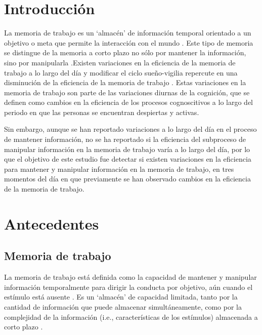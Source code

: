 \documentclass[12pt,letterpaper,final]{article}
\let\cite\cite %
\begin{document}
\section{Introducción}
La memoria de trabajo es un `almacén' de información temporal orientado a un objetivo o meta que permite la interacción con el mundo \cite{Baddeley2001}. Este tipo de memoria se distingue de la memoria a corto plazo no sólo por mantener la información, sino por manipularla \cite{Baddeley2001}.Existen variaciones en la eficiencia de la memoria de trabajo a lo largo del día y modificar el ciclo sueño-vigilia repercute en una disminución de la eficiencia de la memoria de trabajo \cite{Baddeley1970,Folkard1980,Folkard1983,Ramirez2006,Valdez2012,Valdez2014,Schmidt2015}.
Estas variaciones en la memoria de trabajo son parte de las variaciones diurnas de la cognición, que se definen como cambios en la eficiencia de los procesos cognoscitivos  a lo largo del periodo en que las personas se encuentran despiertas y activas.

Sin embargo, aunque se han reportado variaciones a lo largo del día en el proceso de mantener información, no se ha reportado si la eficiencia del subproceso de manipular información en la memoria de trabajo varía a lo largo del día, por lo que el objetivo de este estudio fue detectar si existen variaciones en la eficiencia para mantener y manipular información en la memoria de trabajo, en tres momentos del día en que previamente se han observado cambios en la eficiencia de la memoria de trabajo.
\newpage

\section{Antecedentes}

\subsection{Memoria de trabajo}
La memoria de trabajo está definida como la capacidad de mantener y manipular información temporalmente para dirigir la conducta por objetivo, aún cuando el estímulo está ausente \cite{Eriksson2015,Baddeley1974,Ricker2010}.
Es un `almacén' de capacidad limitada, tanto por la cantidad de información que puede almacenar simultáneamente, como por la complejidad de la información (i.e., características de los estímulos) almacenada a corto plazo \cite{Eriksson2015,Baddeley2001}.
\end{document}
